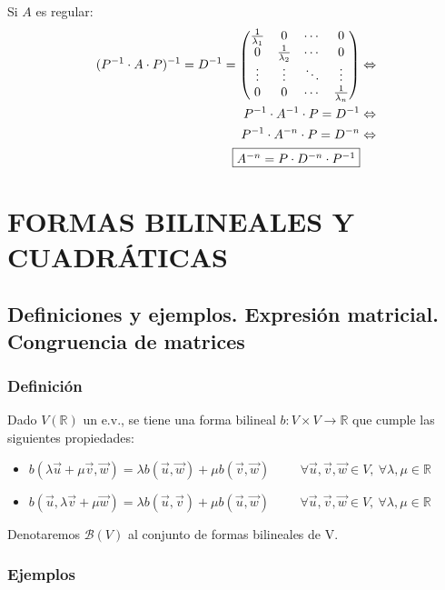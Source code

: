 \documentclass[x11names,table]{report}
\begin{document}
Si $A$ es regular:
\[ 
\begin{split}
(P^{-1}\cdot A\cdot P)^{-1}=D^{-1}=
\begin{pmatrix}
\frac{1}{\lambda_1}&0&\cdots&0\\
0&\frac{1}{\lambda_2}&\cdots&0\\
\vdots&\vdots&\ddots&\vdots\\
0&0&\cdots&\frac{1}{\lambda_n}\\
\end{pmatrix}&\Leftrightarrow\\
P^{-1}\cdot A^{-1}\cdot P=D^{-1}&\Leftrightarrow\\
P^{-1}\cdot A^{-n}\cdot P=D^{-n}&\Leftrightarrow\\
\fcolorbox{black}{white}{$A^{-n}=P\cdot D^{-n}\cdot P^{-1}$}& \\
\end{split}\]

\chapter{FORMAS BILINEALES Y CUADRÁTICAS}

\section{Definiciones y ejemplos. Expresión matricial. Congruencia de matrices}
\subsection*{Definición}
Dado $V(\mathbb{R})$ un e.v., se tiene una forma bilineal $b:V\times V\longrightarrow\mathbb{R}$ que cumple las siguientes propiedades:
\begin{itemize}
\item $b(\lambda\vec{u}+\mu\vec{v},\vec{w})=\lambda b(\vec{u},\vec{w})+\mu b(\vec{v},\vec{w})\hspace{1cm} \forall\vec{u},\vec{v},\vec{w}\in V,\  \forall \lambda,\mu\in\mathbb{R}$
\item $b(\vec{u},\lambda\vec{v}+\mu\vec{w})=\lambda b(\vec{u},\vec{v})+\mu b(\vec{u},\vec{w})\hspace{1cm} \forall\vec{u},\vec{v},\vec{w}\in V,\  \forall \lambda,\mu\in\mathbb{R}$
\end{itemize}
Denotaremos $\mathcal{B}(V)$ al conjunto de formas bilineales de V.

\subsection*{Ejemplos}
\end{document}
